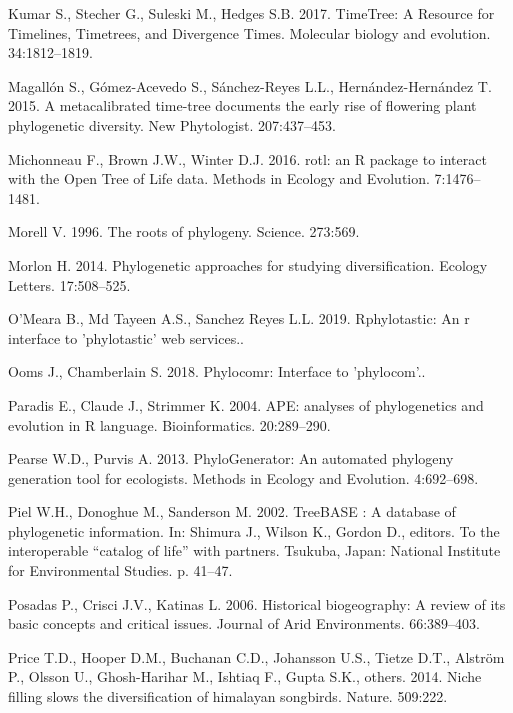 \documentclass[]{article}
\begin{document}
\leavevmode\hypertarget{ref-Kumar2017}{}%
Kumar S., Stecher G., Suleski M., Hedges S.B. 2017. TimeTree: A Resource for Timelines, Timetrees, and Divergence Times. Molecular biology and evolution. 34:1812--1819.

\leavevmode\hypertarget{ref-magallon2015metacalibrated}{}%
Magallón S., Gómez-Acevedo S., Sánchez-Reyes L.L., Hernández-Hernández T. 2015. A metacalibrated time-tree documents the early rise of flowering plant phylogenetic diversity. New Phytologist. 207:437--453.

\leavevmode\hypertarget{ref-Michonneau2016}{}%
Michonneau F., Brown J.W., Winter D.J. 2016. rotl: an R package to interact with the Open Tree of Life data. Methods in Ecology and Evolution. 7:1476--1481.

\leavevmode\hypertarget{ref-morell1996roots}{}%
Morell V. 1996. The roots of phylogeny. Science. 273:569.

\leavevmode\hypertarget{ref-Morlon2014}{}%
Morlon H. 2014. Phylogenetic approaches for studying diversification. Ecology Letters. 17:508--525.

\leavevmode\hypertarget{ref-Omeara2019}{}%
O'Meara B., Md Tayeen A.S., Sanchez Reyes L.L. 2019. Rphylotastic: An r interface to 'phylotastic' web services..

\leavevmode\hypertarget{ref-Ooms2018}{}%
Ooms J., Chamberlain S. 2018. Phylocomr: Interface to 'phylocom'..

\leavevmode\hypertarget{ref-Paradis2004}{}%
Paradis E., Claude J., Strimmer K. 2004. APE: analyses of phylogenetics and evolution in R language. Bioinformatics. 20:289--290.

\leavevmode\hypertarget{ref-pearse2013phylogenerator}{}%
Pearse W.D., Purvis A. 2013. PhyloGenerator: An automated phylogeny generation tool for ecologists. Methods in Ecology and Evolution. 4:692--698.

\leavevmode\hypertarget{ref-Piel2002}{}%
Piel W.H., Donoghue M., Sanderson M. 2002. TreeBASE : A database of phylogenetic information. In: Shimura J., Wilson K., Gordon D., editors. To the interoperable ``catalog of life'' with partners. Tsukuba, Japan: National Institute for Environmental Studies. p. 41--47.

\leavevmode\hypertarget{ref-posadas2006historical}{}%
Posadas P., Crisci J.V., Katinas L. 2006. Historical biogeography: A review of its basic concepts and critical issues. Journal of Arid Environments. 66:389--403.

\leavevmode\hypertarget{ref-price2014niche}{}%
Price T.D., Hooper D.M., Buchanan C.D., Johansson U.S., Tietze D.T., Alström P., Olsson U., Ghosh-Harihar M., Ishtiaq F., Gupta S.K., others. 2014. Niche filling slows the diversification of himalayan songbirds. Nature. 509:222.
\end{document}
